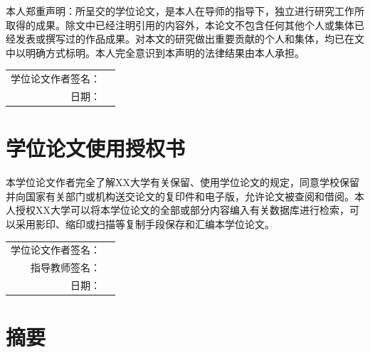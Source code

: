 \documentclass[12pt,a4paper]{ctexbook}
\begin{document}
本人郑重声明：所呈交的学位论文，是本人在导师的指导下，独立进行研究工作所取得的成果。除文中已经注明引用的内容外，本论文不包含任何其他个人或集体已经发表或撰写过的作品成果。对本文的研究做出重要贡献的个人和集体，均已在文中以明确方式标明。本人完全意识到本声明的法律结果由本人承担。

\vspace{3cm}

\begin{flushright}
    \begin{tabular}{rl}
        学位论文作者签名：& \underline{\hspace{5cm}} \\[1.5em]
        日期：& \underline{\hspace{5cm}} \\
    \end{tabular}
\end{flushright}

\newpage

\chapter*{学位论文使用授权书}

本学位论文作者完全了解XX大学有关保留、使用学位论文的规定，同意学校保留并向国家有关部门或机构送交论文的复印件和电子版，允许论文被查阅和借阅。本人授权XX大学可以将本学位论文的全部或部分内容编入有关数据库进行检索，可以采用影印、缩印或扫描等复制手段保存和汇编本学位论文。

\vspace{1cm}

\begin{flushright}
    \begin{tabular}{rl}
        学位论文作者签名：& \underline{\hspace{5cm}} \\[1.5em]
        指导教师签名：& \underline{\hspace{5cm}} \\[1.5em]
        日期：& \underline{\hspace{5cm}} \\
    \end{tabular}
\end{flushright}

\newpage

\chapter*{摘\quad 要}
\end{document}
